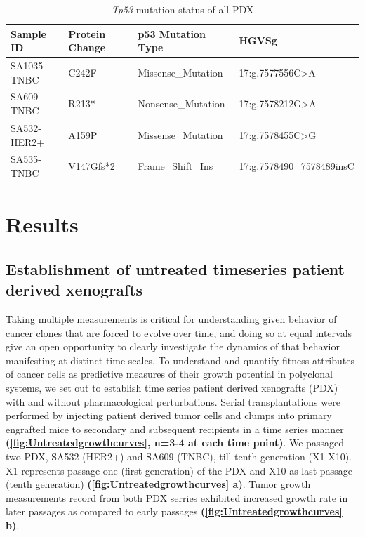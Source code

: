  \begin{table}[htbp]
   \centering
   \caption{\textit{Tp53} mutation status of all PDX}
     \begin{tabular}{|l|l|l|l|}
     \hline
     Sample ID & Protein Change & p53 Mutation Type & HGVSg \\
     \hline
     SA1035-TNBC  & C242F & Missense\_Mutation & 17:g.7577556C>A \\
     SA609-TNBC & R213* & Nonsense\_Mutation & 17:g.7578212G>A \\
     SA532-HER2+ & A159P & Missense\_Mutation & 17:g.7578455C>G \\
     SA535-TNBC & V147Gfs*2 & Frame\_Shift\_Ins & 17:g.7578490\_7578489insC \\
     \hline
     \end{tabular}%
   \label{tab:Tp53mutationofPDX}%
 \end{table}%
















\section{Results}

 
\subsection{Establishment of untreated timeseries patient derived xenografts}
Taking multiple measurements is critical for understanding  given behavior of cancer clones that are forced to evolve over time, and doing so at equal intervals give an open opportunity to clearly investigate the dynamics of that behavior manifesting at distinct time scales. 
To understand and quantify fitness attributes of cancer cells as  predictive measures of their growth potential in polyclonal systems, we set out to establish time series patient derived xenografts (PDX) with and without pharmacological perturbations.
Serial transplantations were performed by injecting patient derived tumor cells and clumps into primary engrafted mice to secondary and subsequent recipients in a time series manner \textbf{(\autoref{fig:Untreatedgrowthcurves}, n=3-4 at each time point)}. We passaged two PDX, SA532 (HER2+) and SA609 (TNBC), till tenth generation (X1-X10). X1 represents passage one (first generation) of the PDX and X10 as last passage (tenth generation)   \textbf{(\autoref{fig:Untreatedgrowthcurves} a)}. 
Tumor growth measurements record from both PDX serries exhibited increased growth rate in later passages as compared to early passages \textbf{(\autoref{fig:Untreatedgrowthcurves} b)}.
 
